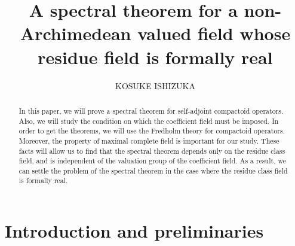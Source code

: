 \documentclass[12pt]{amsart}
\title[SPECTRAL THEOREM]%
{A spectral theorem for a non-Archimedean valued field whose residue field is formally real}
\author[ISHIZUKA]%
{KOSUKE ISHIZUKA}
\date{}
\theoremstyle{plain}
\theoremstyle{definition}
\begin{document}
\begin{abstract}
In this paper, we will prove a spectral theorem for self-adjoint compactoid operators. Also, we will study the condition on which the coefficient field must be imposed. In order to get the theorems, we will use the Fredholm theory for compactoid operators. Moreover, the property of maximal complete field is important for our study. These facts will allow us to find that the spectral theorem depends only on the residue class field, and is independent of the valuation group of the coefficient field. As a result, we can settle the problem of the spectral theorem in the case where the residue class field is formally real.
\end{abstract}

\maketitle

\section{Introduction and preliminaries}
\end{document}
